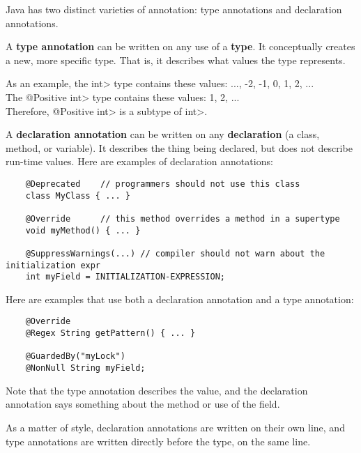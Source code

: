 
Java has two distinct varieties of annotation:  type annotations and
declaration annotations.

A \textbf{type annotation} can be written on any use of a \textbf{type}.
It conceptually creates a new, more specific type.
That is, it describes what values the type represents.

As an example, the \<int> type contains these values: ..., -2, -1, 0, 1, 2, ...  \\
The \<@Positive int> type contains these values:  1, 2, ...   \\
Therefore, \<@Positive int> is a subtype of \<int>.

A \textbf{declaration annotation} can be written on any \textbf{declaration} (a class, method, or variable).  It describes the thing being declared, but does not describe run-time values.  Here are examples of declaration annotations:

\begin{Verbatim}
    @Deprecated    // programmers should not use this class
    class MyClass { ... }

    @Override      // this method overrides a method in a supertype
    void myMethod() { ... }

    @SuppressWarnings(...) // compiler should not warn about the initialization expr
    int myField = INITIALIZATION-EXPRESSION;
\end{Verbatim}

Here are examples that use both a declaration annotation and a type annotation:

\begin{Verbatim}
    @Override
    @Regex String getPattern() { ... }

    @GuardedBy("myLock")
    @NonNull String myField;
\end{Verbatim}

Note that the type annotation describes the value, and the declaration annotation says something about the method or use of the field.

As a matter of style, declaration annotations are written on their own line, and type annotations are written directly before the type, on the same line.





